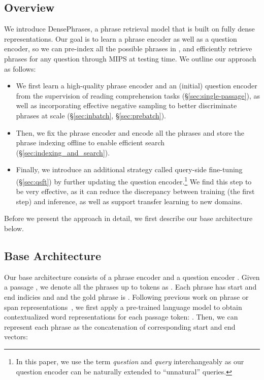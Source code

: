 \documentclass[11pt,a4paper]{article}
\newcommand{\ours}{DensePhrases}
\newcommand\ti[1]{\textit{#1}}
\begin{document}
\subsection{Overview}

We introduce {\ours}, a phrase retrieval model that is built on fully dense representations.
Our goal is to learn a {phrase} encoder as well as a {question} encoder, so we can pre-index all the possible phrases in , and efficiently retrieve phrases for any question through MIPS at testing time. We outline our approach as follows:
\begin{itemize}[noitemsep]
\item
We first learn a high-quality phrase encoder and an (initial) question encoder from the supervision of reading comprehension tasks (\S\ref{sec:single-passage}), as well as incorporating effective negative sampling to better discriminate phrases at scale (\S\ref{sec:inbatch}, \S\ref{sec:prebatch}).
\item
Then, we fix the phrase encoder and encode all the phrases  and store the phrase indexing offline to enable efficient search (\S\ref{sec:indexing_and_search}).
\item
Finally, we introduce an additional strategy called query-side fine-tuning (\S\ref{sec:qsft}) by further updating the question encoder.\footnote{In this paper, we use the term \ti{question} and \ti{query} interchangeably as our question encoder can be naturally extended to ``unnatural'' queries.} We find this step to be very effective, as it can reduce the discrepancy between training (the first step) and inference, as well as support transfer learning to new domains.
\end{itemize}

Before we present the approach in detail, we first describe our base architecture below.



\subsection{Base Architecture}
\label{sec:base_model}
Our base architecture consists of a phrase encoder  and a question encoder . Given a passage , we denote all the phrases up to  tokens as . Each phrase  has start and end indicies  and  and the gold phrase is .
Following previous work on phrase or span representations~\citep{lee2017learning,seo2018phrase}, we first apply a pre-trained language model  to obtain contextualized word representations for each passage token: . Then, we can represent each phrase  as the concatenation of corresponding start and end vectors:
\vspace{-0.5em}
\end{document}
